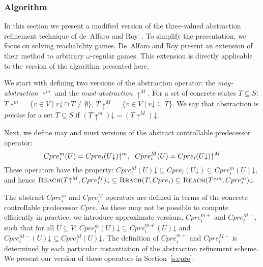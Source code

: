 \documentclass{article}
\newcommand{\reach}[0]{\textsc{Reach}}
\newcommand{\concrete}[1]{#1\mathord{\downarrow}}
\newcommand{\abstractm}[1]{#1\mathord{\uparrow^m}}
\newcommand{\abstractM}[1]{#1\mathord{\uparrow^M}}
\begin{document}
\subsubsection{Algorithm}
In this section we present a modified version of the three-valued 
abstraction refinement technique of de~Alfaro and 
Roy~\cite{Alfaro_Roy_07}.  To simplify the presentation, we focus 
on solving reachability games.  De~Alfaro and Roy present an 
extension of their method to arbitrary $\omega$-regular games.  
This extension is directly applicable to the version of the 
algorithm presented here.

We start with defining two versions of the abstraction operator: 
the \emph{may-abstraction} $\abstractm{}$ and the 
\emph{must-abstraction} $\abstractM{}$. For a set of concrete 
states $T \subseteq S$:
$\abstractm{T} = \{v\in V\mid \concrete{v} \cap T \neq 
\emptyset\}$, $\abstractM{T} = \{v\in V\mid \concrete{v} \subseteq 
T \}$.
We say that abstraction is \emph{precise} for a set $T\subseteq S$ 
if $\concrete{(\abstractm{T})} = \concrete{(\abstractM{T})}$.

Next, we define may and must versions of the abstract controllable 
predecessor operator:
\begin{equation}
    \small
    Cpre_i^m(U) = \abstractm{Cpre_i(\concrete{U})},~~
    Cpre_i^M(U) = \abstractM{Cpre_i(\concrete{U})}
\label{e:cpremM}
\end{equation}
These operators have the property:
$\concrete{Cpre_i^M(U)} \subseteq Cpre_i(\concrete{U}) \subseteq \concrete{Cpre_i^m(U)},$ and hence
$\concrete{\reach(\abstractM{T}, Cpre_i^M)} \subseteq \reach(T, Cpre_i) \subseteq \concrete{\reach(\abstractm{T}, Cpre_i^m)}.$

The abstract $Cpre_i^m$ and $Cpre_i^M$ operators are defined in 
terms of the concrete controllable predecessor $Cpre$. As these 
may not be possible to compute efficiently in practice, we 
introduce approximate versions, $Cpre_i^{m+}$ and $Cpre_i^{M-}$, 
such that for all $U\subseteq V$: $\concrete{Cpre_i^m(U)} 
\subseteq \concrete{Cpre_i^{m+}(U)}$ and 
$\concrete{Cpre_i^{M-}(U)}
\subseteq \concrete{Cpre_i^M(U)}.$  The definition of 
$Cpre_i^{m+}$ and $Cpre_i^{M-}$ is determined by each particular 
instantiation of the abstraction refinement scheme.  We present 
our version of these operators in Section~\ref{s:cpre}.  
\end{document}
